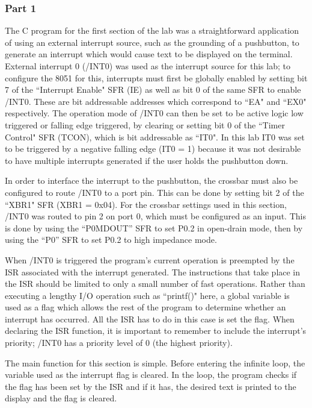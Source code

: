 \documentclass[12pt]{article}
\begin{document}
\subsubsection{Part 1}
The C program for the first section of the lab was a straightforward application of using an external interrupt source, such as the grounding of a pushbutton, to generate an interrupt which would cause text to be displayed on the terminal. External interrupt 0 (/INT0) was used as the interrupt source for this lab; to configure the 8051 for this, interrupts must first be globally enabled by setting bit 7 of the ``Interrupt Enable" SFR (IE) as well as bit 0 of the same SFR to enable /INT0. These are bit addressable addresses which correspond to ``EA" and ``EX0" respectively. The operation mode of /INT0 can then be set to be active logic low triggered or falling edge triggered, by clearing or setting bit 0 of the ``Timer Control" SFR (TCON), which is bit addressable as ``IT0". In this lab IT0 was set to be triggered by a negative falling edge (IT0 = 1) because it was not desirable to have multiple interrupts generated if the user holds the pushbutton down. 

In order to interface the interrupt to the pushbutton, the crossbar must also be configured to route /INT0 to a port pin. This can be done by setting bit 2 of the ``XBR1" SFR (XBR1 = 0x04). For the crossbar settings used in this section, /INT0 was routed to pin 2 on port 0, which must be configured as an input. This is done by using the ``P0MDOUT'' SFR to set P0.2 in open-drain mode, then by using the ``P0'' SFR to set P0.2 to high impedance mode.  

When /INT0 is triggered the program's current operation is preempted by the ISR associated with the interrupt generated. The instructions that take place in the ISR should be limited to only a small number of fast operations. Rather than executing a lengthy I/O operation such as ``printf()" here, a global variable is used as a flag which allows the rest of the program to determine whether an interrupt has occurred. All the ISR has to do in this case is set the flag. When declaring the ISR function, it is important to remember to include the interrupt's priority; /INT0 has a priority level of 0 (the highest priority).

The main function for this section is simple. Before entering the infinite loop, the variable used as the interrupt flag is cleared. In the loop, the program checks if the flag has been set by the ISR and if it has, the desired text is printed to the display and the flag is cleared.
\end{document}
